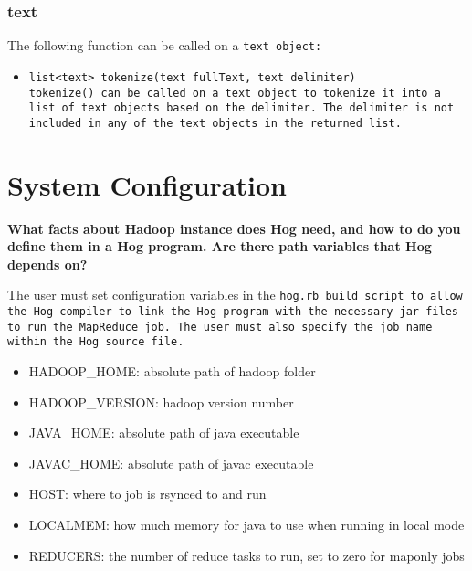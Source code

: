 \documentclass{book}
\begin{document}

\subsection{text} %
\label{sub:text}

The following function can be called on a \tt text \rm object:

\begin{itemize}

\item[] \tt list<text> tokenize(text fullText, text delimiter) \rm \\

\tt tokenize() \rm can be called on a \tt text \rm object to tokenize it into a
list of \tt text \rm objects based on the delimiter. The delimiter is not included
in any of the \tt text \rm objects in the returned list.

\end{itemize}




\chapter{System Configuration} %
\label{cha:system_configuration}

\textbf{What facts about Hadoop instance does Hog need, and how to do you define
them in a Hog program. Are there path variables that Hog depends on?}

The user must set configuration variables in the \tt hog.rb \rm build script to
allow the Hog compiler to link the Hog program with the necessary jar files to run
the MapReduce job. The user must also specify the job name within the Hog source
file.

\begin{itemize}

\item[] HADOOP\_HOME: absolute path of hadoop folder
\item[] HADOOP\_VERSION: hadoop version number
\item[] JAVA\_HOME: absolute path of java executable
\item[] JAVAC\_HOME: absolute path of javac executable
\item[] HOST: where to job is rsynced to and run
\item[] LOCALMEM: how much memory for java to use when running in local mode 
\item[] REDUCERS: the number of reduce tasks to run, set to zero for map­only jobs

\end{itemize}
\end{document}
